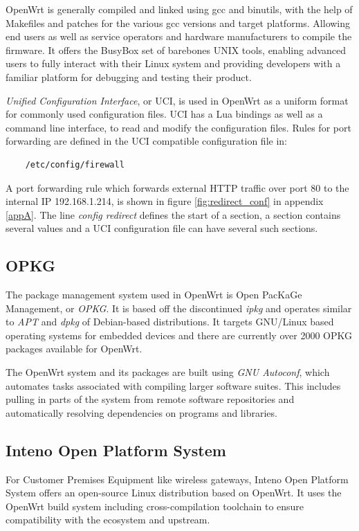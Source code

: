\documentclass[a4paper,11pt,makeidx]{kth-bcs}
\begin{document}
OpenWrt is generally compiled and linked using gcc and binutils, with the help of Makefiles and patches for the various gcc versions and target platforms.
Allowing end users as well as service operators and hardware manufacturers to compile the firmware.
It offers the BusyBox set of barebones UNIX tools, enabling advanced users to fully interact with their Linux system and providing developers with a familiar platform for debugging and testing their product.\cite{OpenWrt:structure_design}

\emph{Unified Configuration Interface}, or UCI, is used in OpenWrt as a uniform format for commonly used configuration files.
UCI has a Lua bindings as well as a command line interface, to read and modify the configuration files.
Rules for port forwarding are defined in the UCI compatible configuration file in:
\begin{verbatim}
    /etc/config/firewall
\end{verbatim}

A port forwarding rule which forwards external HTTP traffic over port 80 to the internal IP 192.168.1.214, is shown in figure \ref{fig:redirect_conf} in appendix \ref{appA}.
The line \emph{config redirect} defines the start of a section, a section contains several values and a UCI configuration file can have several such sections.

\subsection{OPKG}
The package management system used in OpenWrt is Open PacKaGe Management, or \emph{OPKG}. It is based off the discontinued \emph{ipkg} and operates similar to \emph{APT} and \emph{dpkg} of Debian-based distributions.
It targets GNU/Linux based operating systems for embedded devices and there are currently over 2000 OPKG packages available for OpenWrt.

The OpenWrt system and its packages are built using \emph{GNU Autoconf}, which automates tasks associated with compiling larger software suites.
This includes pulling in parts of the system from remote software repositories and automatically resolving dependencies on programs and libraries.

\subsection{Inteno Open Platform System}
For Customer Premises Equipment like wireless gateways, Inteno Open Platform System offers an open-source Linux distribution based on OpenWrt.
It uses the OpenWrt build system including cross-compilation toolchain to ensure compatibility with the ecosystem and upstream.
\end{document}

